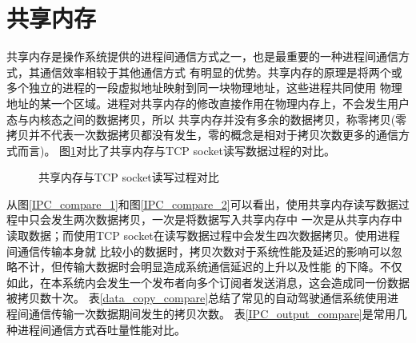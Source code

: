 \section{共享内存}
共享内存是操作系统提供的进程间通信方式之一，也是最重要的一种进程间通信方式，其通信效率相较于其他通信方式
有明显的优势。共享内存的原理是将两个或多个独立的进程的一段虚拟地址映射到同一块物理地址，这些进程共同使用
物理地址的某一个区域。进程对共享内存的修改直接作用在物理内存上，不会发生用户态与内核态之间的数据拷贝，所以
共享内存并没有多余的数据拷贝，称零拷贝(零拷贝并不代表一次数据拷贝都没有发生，零的概念是相对于拷贝次数更多的通信方式而言)。
图\ref{IPC_compare}对比了共享内存与TCP socket读写数据过程的对比。
\begin{figure}[H]
  \centering
  \caption{共享内存与TCP socket读写过程对比}
  \label{IPC_compare}
\end{figure}
从图\ref{IPC_compare_1}和图\ref{IPC_compare_2}可以看出，使用共享内存读写数据过程中只会发生两次数据拷贝，一次是将数据写入共享内存中
一次是从共享内存中读取数据；而使用TCP socket在读写数据过程中会发生四次数据拷贝。使用进程间通信传输本身就
比较小的数据时，拷贝次数对于系统性能及延迟的影响可以忽略不计，但传输大数据时会明显造成系统通信延迟的上升以及性能
的下降。不仅如此，在本系统内会发生一个发布者向多个订阅者发送消息，这会造成同一份数据被拷贝数十次。
表\ref{data_copy_compare}总结了常见的自动驾驶通信系统使用进程间通信传输一次数据期间发生的拷贝次数。
表\ref{IPC_output_compare}是常用几种进程间通信方式吞吐量性能对比。
\begin{table}[H]
  \centering\small
  \caption{自动驾驶通信系统数据拷贝次数总结\cite{8968462}}
  \label{data_copy_compare}
\end{table}

